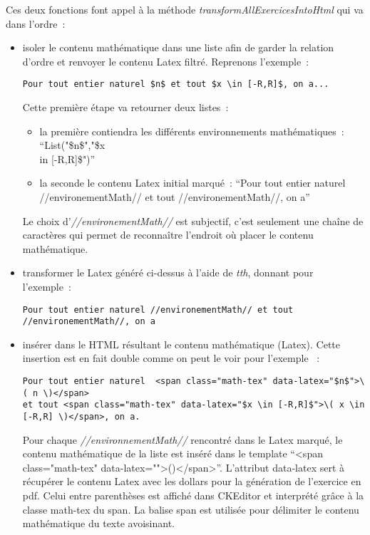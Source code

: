 Ces deux fonctions font appel à la méthode \textit{transformAllExercicesIntoHtml} qui va dans l'ordre~:

\medskip
\begin{itemize}
\item isoler le contenu mathématique dans une liste afin de garder la relation d'ordre et renvoyer le contenu Latex filtré. Reprenons l'exemple~:

\begin{Verbatim}[frame=single,fontsize=\scriptsize]
 Pour tout entier naturel $n$ et tout $x \in [-R,R]$, on a...
\end{Verbatim}

Cette première étape va retourner deux listes~:
\smallskip
\begin{itemize}
\item la première contiendra les différents environnements mathématiques~: \enquote{List("\$n\$","\$x \\in [-R,R]\$")}
\item la seconde le contenu Latex initial marqué~: \enquote{Pour tout entier naturel //environementMath// et tout //environementMath//, on a}
\end{itemize}
\medskip

Le choix d'\textit{//environementMath//} est subjectif, c'est seulement une chaîne de caractères qui permet de reconnaître l'endroit où placer le contenu mathématique.
\medskip

\item transformer le Latex généré ci-dessus à l'aide de \emph{tth}, donnant pour l'exemple~:
 \begin{Verbatim}[frame=single,fontsize=\scriptsize]
Pour tout entier naturel //environementMath// et tout //environementMath//, on a
\end{Verbatim}
\item insérer dans le HTML résultant le contenu mathématique (Latex). Cette insertion est en fait double comme on peut le voir pour l'exemple ~:

\begin{Verbatim}[frame=single,fontsize=\scriptsize]
Pour tout entier naturel  <span class="math-tex" data-latex="$n$">\( n \)</span>
et tout <span class="math-tex" data-latex="$x \in [-R,R]$">\( x \in [-R,R] \)</span>, on a.
\end{Verbatim}

Pour chaque \textit{//environnementMath//} rencontré dans le Latex marqué, le contenu mathématique de la liste est inséré dans le template 
\enquote{<span class="math-tex" data-latex="">()</span>}. L'attribut data-latex sert à récupérer le contenu Latex avec les dollars pour la génération de l'exercice en pdf. Celui entre parenthèses est affiché dans CKEditor et interprété grâce à la classe math-tex du span. La balise span est utilisée pour délimiter le contenu mathématique du texte avoisinant.
\end{itemize}
\medskip


